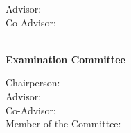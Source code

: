 \begin{titlepage}
\begin{center}
\begin{minipage}[t]{.4\textwidth}
  \begin{flushright}
    {\large Advisor:~~}\\
    {\large Co-Advisor:~~}
  \end{flushright}
\end{minipage}%
\begin{minipage}[t]{.6\textwidth}
  \begin{flushleft}
    {\Supervisors}
  \end{flushleft}
\end{minipage}\\
%
\if{}
  \vspace*{\finalAdvisorsSpacing}
\else
  \vspace*{\draftAdvisorsSpacing}
\fi
\if{}
%
{\Large \textbf{Examination Committee}}\\[.25cm]

\begin{minipage}[t]{.4\textwidth}
  \begin{flushright}
    \if{}
    {\large Chairperson:\:}\\
    \fi
    {\large Advisor:\:}\\
    \if{}
    {\large Co-Advisor:}\\
    \fi
    \if{}
    {\large Member of the Committee:\:}
    \fi
  \end{flushright}
\end{minipage}%
\begin{minipage}[t]{.6\textwidth}
  \begin{flushleft}
    \if{}
    {\Chairperson}\\
    \fi
    {\Advisor}\\
    \if{}
    {\CoAdvisor}\\
    \fi
    \if{}
    {\CommitteeMembers}
    \fi
  \end{flushleft}
\end{minipage}\\[1.0cm]
%
\fi

\if{}
 \vspace*{\dateSpacing}
\fi

{\Large \textbf{\Month\:\Year}}\\
\end{center}
\end{titlepage}
